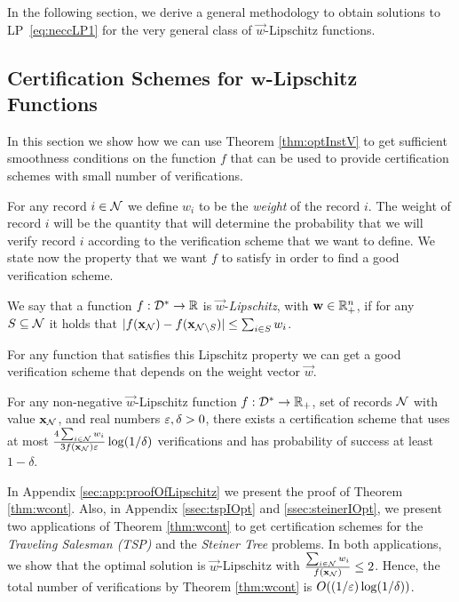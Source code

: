 In the following section, we derive a general methodology to obtain solutions to LP~\eqref{eq:neccLP1} for the very general class of
$\vec{w}$-Lipschitz functions.

\subsection{Certification Schemes for $\mathbf{w}$-Lipschitz Functions}

  In this section we show how we can use Theorem \ref{thm:optInstV} to get sufficient smoothness conditions on the function $f$
that can be used to provide certification schemes with small number of verifications.

  For any record $i \in \mathcal{N}$ we define $w_i$ to be the \textit{weight} of the record $i$. The weight of record $i$ will be
the quantity that will determine the probability that we will verify record $i$ according to the verification scheme that we want
to define. We state now the property that we want $f$ to satisfy in order to find a good verification scheme.

\begin{definition} \label{def:wcont}
  We say that a function $f : \mathcal{D}^* \to \mathbb{R}$ is $\vec{w}$-\emph{Lipschitz}, with $\mathbf{w} \in \mathbb{R}_+^n$, if for any
  $S \subseteq \mathcal{N}$ it holds that $|f(\mathbf{x}_{\mathcal{N}}) - f(\mathbf{x}_{\mathcal{N}\setminus S})| \le \sum_{i \in S} w_i$.
\end{definition}

\noindent For any function that satisfies this Lipschitz property we can get a good verification scheme that depends on the weight
vector $\vec{w}$.

\begin{theorem} \label{thm:wcont}
    For any non-negative $\vec{w}$-Lipschitz function $f : \mathcal{D}^* \to \mathbb{R}_+$, set of records $\mathcal{N}$ with value $\mathbf{x}_{\mathcal{N}}$, and
  real numbers $\varepsilon, \delta > 0$,
  \noindent there exists a certification scheme that uses at most
  $\frac{4\sum_{i \in \mathcal{N}} w_i}{3 f(\mathbf{x}_{\mathcal{N}}) \varepsilon} \log(1 / \delta) $
  verifications and has probability of success at least $1 - \delta$.
\end{theorem}


%

  In Appendix \ref{sec:app:proofOfLipschitz} we present the proof of Theorem \ref{thm:wcont}. Also, in Appendix \ref{ssec:tspIOpt} and \ref{ssec:steinerIOpt}, we present two applications of Theorem \ref{thm:wcont} to get
certification schemes for the \emph{Traveling Salesman (TSP)} and the \emph{Steiner Tree} problems. In both applications, we show that
the optimal solution is $\vec{w}$-Lipschitz with $\frac{\sum_{i \in \mathcal{N}} w_i}{f(\mathbf{x}_{\mathcal{N}})} \le 2$. Hence, the total number of
verifications by Theorem \ref{thm:wcont} is $O((1/\varepsilon) \log(1/\delta))$.
